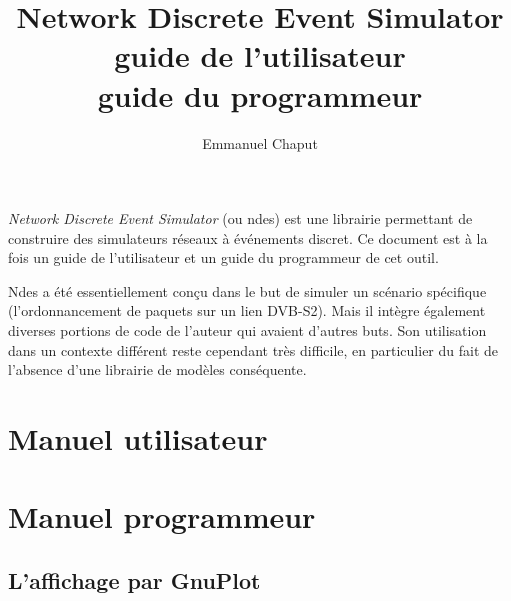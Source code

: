 \documentclass{book}
\title{Network Discrete Event Simulator\\
       guide de l'utilisateur\\
       guide du programmeur}
\author{Emmanuel Chaput}
\begin{document}
\maketitle

   {\em Network Discrete Event Simulator} (ou {\sc ndes}) est une
librairie permettant de construire des simulateurs réseaux à
événements discret. Ce document est à la fois un guide de
l'utilisateur et un guide du programmeur de cet outil.

   {\sc Ndes} a été essentiellement conçu dans le but de simuler un
scénario spécifique (l'ordonnancement de paquets sur un lien
DVB-S2). Mais il intègre également diverses portions de code de
l'auteur qui avaient d'autres buts. Son utilisation dans un contexte
différent reste cependant très difficile, en particulier du fait de
l'absence d'une librairie de modèles conséquente.

\newpage
\tableofcontents
\newpage

%
\chapter{Manuel utilisateur}





%
\chapter{Manuel programmeur}







%
\section{L'affichage par GnuPlot}
\label{section:gnuplot}

%
\end{document}
